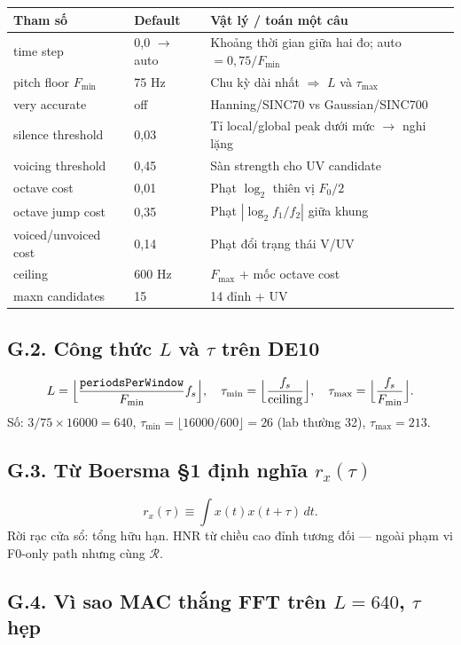 \begin{center}\footnotesize
\begin{tabular}{@{}p{3.2cm}p{2.2cm}p{7cm}@{}}
\toprule
Tham số & Default & Vật lý / toán một câu \\
\midrule
time step & 0{,}0 $\to$ auto & Khoảng thời gian giữa hai đo; auto $=0{,}75/F_{\min}$ \\
pitch floor $F_{\min}$ & 75 Hz & Chu kỳ dài nhất $\Rightarrow$ $L$ và $\tau_{\max}$ \\
very accurate & off & Hanning/SINC70 vs Gaussian/SINC700 \\
silence threshold & 0{,}03 & Tỉ local/global peak dưới mức $\to$ nghi lặng \\
voicing threshold & 0{,}45 & Sàn strength cho UV candidate \\
octave cost & 0{,}01 & Phạt $\log_2$ thiên vị $F_0/2$ \\
octave jump cost & 0{,}35 & Phạt $|\log_2 f_1/f_2|$ giữa khung \\
voiced/unvoiced cost & 0{,}14 & Phạt đổi trạng thái V/UV \\
ceiling & 600 Hz & $F_{\max}$ + mốc octave cost \\
maxn candidates & 15 & 14 đỉnh + UV \\
\bottomrule
\end{tabular}
\end{center}

\subsection*{G.2. Công thức $L$ và $\tau$ trên DE10}

\[
L=\Bigl\lfloor\frac{\texttt{periodsPerWindow}}{F_{\min}}f_s\Bigr\rfloor,\quad
\tau_{\min}=\Bigl\lfloor\frac{f_s}{\mathrm{ceiling}}\Bigr\rfloor,\quad
\tau_{\max}=\Bigl\lfloor\frac{f_s}{F_{\min}}\Bigr\rfloor.
\]
Số: $3/75\times16000=640$, $\tau_{\min}=\lfloor16000/600\rfloor=26$ (lab thường 32), $\tau_{\max}=213$.

\subsection*{G.3. Từ Boersma §1 định nghĩa $r_x(\tau)$}

\[
r_x(\tau)\equiv\int x(t)x(t+\tau)\,dt.
\]
Rời rạc cửa sổ: tổng hữu hạn. HNR từ chiều cao đỉnh tương đối --- ngoài phạm vi F0-only path nhưng cùng $\mathcal{R}$.

\subsection*{G.4. Vì sao MAC thắng FFT trên $L=640$, $\tau$ hẹp}

